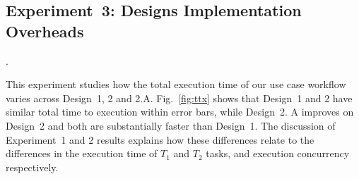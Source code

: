 \subsection{Experiment~3: Designs Implementation Overheads}\label{ssec:exp3}. 

This experiment studies how the total execution time of our use case workflow 
varies across Design~1, 2 and 2.A. Fig.~\ref{fig:ttx} shows that Design~1 
and 2 have similar total time to execution within error bars, while Design~2. 
A improves on Design~2 and both are substantially faster than Design~1. The 
discussion of Experiment~1 and 2 results explains how these differences relate 
to the differences in the execution time of $T_{1}$ and $T_{2}$ tasks, and 
execution concurrency respectively.


